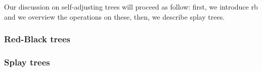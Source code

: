 \documentclass{subfiles}
\begin{document}
    Our discussion on self-adjusting trees will proceed as follow: 
        first, we introduce \gls{rb} and we overview the operations on these,
        then, we describe splay trees.

    \subsubsection{Red-Black trees}
    

    \subsubsection{Splay trees}
    
\end{document}
